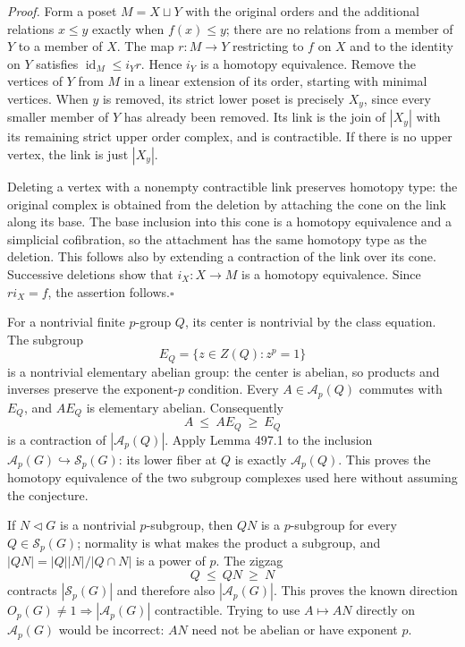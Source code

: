 \documentclass[11pt]{article}
\begin{document}
\emph{Proof.}
Form a poset $M=X\sqcup Y$ with the original orders and the additional
relations $x\leq y$ exactly when $f(x)\leq y$; there are no relations
from a member of $Y$ to a member of $X$. The map $r:M\to Y$ restricting
to $f$ on $X$ and to the identity on $Y$ satisfies
$\operatorname{id}_M\leq i_Yr$. Hence $i_Y$ is a homotopy equivalence.
Remove the vertices of $Y$ from $M$ in a linear extension of its order,
starting with minimal vertices. When $y$ is removed, its strict lower
poset is precisely $X_y$, since every smaller member of $Y$ has already
been removed. Its link is the join of $|X_y|$ with its remaining strict
upper order complex, and is contractible. If there is no upper vertex,
the link is just $|X_y|$.

Deleting a vertex with a nonempty contractible link preserves homotopy
type: the original complex is obtained from the deletion by attaching the
cone on the link along its base. The base inclusion into this cone is a
homotopy equivalence and a simplicial cofibration, so the attachment has
the same homotopy type as the deletion. This follows also by extending a
contraction of the link over its cone. Successive deletions show that
$i_X:X\to M$ is a homotopy equivalence. Since $r i_X=f$, the assertion
follows.\hfill$\square$

For a nontrivial finite $p$-group $Q$, its center is nontrivial by the class
equation. The subgroup
\[
 E_Q=\{z\in Z(Q):z^p=1\}
\]
is a nontrivial elementary abelian group: the center is abelian, so products
and inverses preserve the exponent-$p$ condition. Every
$A\in\mathcal A_p(Q)$ commutes with $E_Q$, and $AE_Q$ is elementary
abelian. Consequently
\[
 A\ \leq\ AE_Q\ \geq\ E_Q
\]
is a contraction of $|\mathcal A_p(Q)|$. Apply Lemma 497.1 to the inclusion
$\mathcal A_p(G)\hookrightarrow\mathcal S_p(G)$: its lower fiber at $Q$
is exactly $\mathcal A_p(Q)$. This proves the homotopy equivalence of the
two subgroup complexes used here without assuming the conjecture.

If $N\triangleleft G$ is a nontrivial $p$-subgroup, then $QN$ is a
$p$-subgroup for every $Q\in\mathcal S_p(G)$; normality is what makes
the product a subgroup, and
$|QN|=|Q||N|/|Q\cap N|$ is a power of $p$. The zigzag
\[
 Q\ \leq\ QN\ \geq\ N
\]
contracts $|\mathcal S_p(G)|$ and therefore also $|\mathcal A_p(G)|$.
This proves the known direction
$O_p(G)\ne1\Rightarrow |\mathcal A_p(G)|$ contractible. Trying to use
$A\mapsto AN$ directly on $\mathcal A_p(G)$ would be incorrect:
$AN$ need not be abelian or have exponent $p$.
\end{document}
